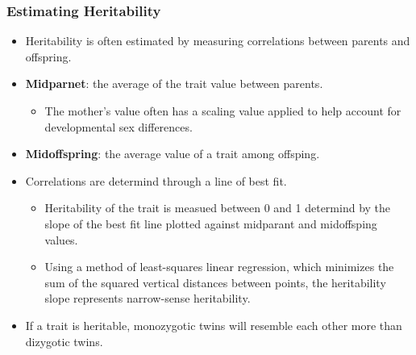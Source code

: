 \documentclass[12pt,a4paper]{article}
\begin{document}
\begin{itemize}
    \subsubsection{Estimating Heritability}
    \begin{itemize}
        \item Heritability is often estimated by measuring correlations between parents and offspring.
        \item \textbf{Midparnet}: the average of the trait value between parents.
            \begin{itemize}
                \item The mother's value often has a scaling value applied to help account for developmental sex differences.
            \end{itemize}
        \item \textbf{Midoffspring}: the average value of a trait among offsping.
        \item Correlations are determind through a line of best fit.
            \begin{itemize}
                \item Heritability of the trait is measued between 0 and 1 determind by the slope of the best fit line plotted against midparant and midoffsping values.
                \item Using a method of {\color{o-Sun}least-squares linear regression}, which minimizes the sum of the squared vertical distances between points, the heritability slope represents {\color{o-Sun}narrow-sense heritability}.
            \end{itemize}
        \item If a trait is heritable, monozygotic twins will resemble each other more than dizygotic twins.
    \end{itemize}

\end{itemize}
\end{document}
